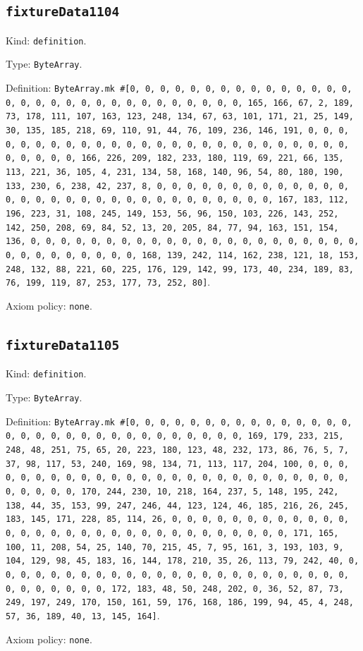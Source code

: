 \documentclass[11pt]{article}
\begin{document}
\subsection*{\texttt{fixtureData1104}}
\noindent Kind: \texttt{definition}.\par
\noindent Type: \texttt{ByteArray}.\par
\noindent Definition: \texttt{ByteArray.mk \#[0, 0, 0, 0, 0, 0, 0, 0, 0, 0, 0, 0, 0, 0, 0, 0, 0, 0, 0, 0, 0, 0, 0, 0, 0, 0, 0, 0, 0, 0, 0, 165, 166, 67, 2, 189, 73, 178, 111, 107, 163, 123, 248, 134, 67, 63, 101, 171, 21, 25, 149, 30, 135, 185, 218, 69, 110, 91, 44, 76, 109, 236, 146, 191, 0, 0, 0, 0, 0, 0, 0, 0, 0, 0, 0, 0, 0, 0, 0, 0, 0, 0, 0, 0, 0, 0, 0, 0, 0, 0, 0, 0, 0, 0, 0, 166, 226, 209, 182, 233, 180, 119, 69, 221, 66, 135, 113, 221, 36, 105, 4, 231, 134, 58, 168, 140, 96, 54, 80, 180, 190, 133, 230, 6, 238, 42, 237, 8, 0, 0, 0, 0, 0, 0, 0, 0, 0, 0, 0, 0, 0, 0, 0, 0, 0, 0, 0, 0, 0, 0, 0, 0, 0, 0, 0, 0, 0, 0, 0, 167, 183, 112, 196, 223, 31, 108, 245, 149, 153, 56, 96, 150, 103, 226, 143, 252, 142, 250, 208, 69, 84, 52, 13, 20, 205, 84, 77, 94, 163, 151, 154, 136, 0, 0, 0, 0, 0, 0, 0, 0, 0, 0, 0, 0, 0, 0, 0, 0, 0, 0, 0, 0, 0, 0, 0, 0, 0, 0, 0, 0, 0, 0, 0, 168, 139, 242, 114, 162, 238, 121, 18, 153, 248, 132, 88, 221, 60, 225, 176, 129, 142, 99, 173, 40, 234, 189, 83, 76, 199, 119, 87, 253, 177, 73, 252, 80]}.\par
\noindent Axiom policy: \texttt{none}.\par
\subsection*{\texttt{fixtureData1105}}
\noindent Kind: \texttt{definition}.\par
\noindent Type: \texttt{ByteArray}.\par
\noindent Definition: \texttt{ByteArray.mk \#[0, 0, 0, 0, 0, 0, 0, 0, 0, 0, 0, 0, 0, 0, 0, 0, 0, 0, 0, 0, 0, 0, 0, 0, 0, 0, 0, 0, 0, 0, 0, 169, 179, 233, 215, 248, 48, 251, 75, 65, 20, 223, 180, 123, 48, 232, 173, 86, 76, 5, 7, 37, 98, 117, 53, 240, 169, 98, 134, 71, 113, 117, 204, 100, 0, 0, 0, 0, 0, 0, 0, 0, 0, 0, 0, 0, 0, 0, 0, 0, 0, 0, 0, 0, 0, 0, 0, 0, 0, 0, 0, 0, 0, 0, 0, 170, 244, 230, 10, 218, 164, 237, 5, 148, 195, 242, 138, 44, 35, 153, 99, 247, 246, 44, 123, 124, 46, 185, 216, 26, 245, 183, 145, 171, 228, 85, 114, 26, 0, 0, 0, 0, 0, 0, 0, 0, 0, 0, 0, 0, 0, 0, 0, 0, 0, 0, 0, 0, 0, 0, 0, 0, 0, 0, 0, 0, 0, 0, 0, 171, 165, 100, 11, 208, 54, 25, 140, 70, 215, 45, 7, 95, 161, 3, 193, 103, 9, 104, 129, 98, 45, 183, 16, 144, 178, 210, 35, 26, 113, 79, 242, 40, 0, 0, 0, 0, 0, 0, 0, 0, 0, 0, 0, 0, 0, 0, 0, 0, 0, 0, 0, 0, 0, 0, 0, 0, 0, 0, 0, 0, 0, 0, 0, 172, 183, 48, 50, 248, 202, 0, 36, 52, 87, 73, 249, 197, 249, 170, 150, 161, 59, 176, 168, 186, 199, 94, 45, 4, 248, 57, 36, 189, 40, 13, 145, 164]}.\par
\noindent Axiom policy: \texttt{none}.\par
\end{document}
